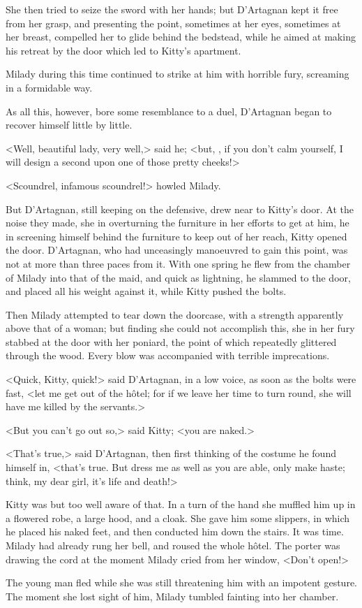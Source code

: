 She then tried to seize the sword with her hands; but D'Artagnan kept it free from her grasp, and presenting the point, sometimes at her eyes, sometimes at her breast, compelled her to glide behind the bedstead, while he aimed at making his retreat by the door which led to Kitty's apartment. 

Milady during this time continued to strike at him with horrible fury, screaming in a formidable way. 

As all this, however, bore some resemblance to a duel, D'Artagnan began to recover himself little by little. 

<Well, beautiful lady, very well,> said he; <but, , if you don't calm yourself, I will design a second  upon one of those pretty cheeks!> 

<Scoundrel, infamous scoundrel!> howled Milady. 

But D'Artagnan, still keeping on the defensive, drew near to Kitty's door. At the noise they made, she in overturning the furniture in her efforts to get at him, he in screening himself behind the furniture to keep out of her reach, Kitty opened the door. D'Artagnan, who had unceasingly manoeuvred to gain this point, was not at more than three paces from it. With one spring he flew from the chamber of Milady into that of the maid, and quick as lightning, he slammed to the door, and placed all his weight against it, while Kitty pushed the bolts. 

Then Milady attempted to tear down the doorcase, with a strength apparently above that of a woman; but finding she could not accomplish this, she in her fury stabbed at the door with her poniard, the point of which repeatedly glittered through the wood. Every blow was accompanied with terrible imprecations. 

<Quick, Kitty, quick!> said D'Artagnan, in a low voice, as soon as the bolts were fast, <let me get out of the hôtel; for if we leave her time to turn round, she will have me killed by the servants.> 

<But you can't go out so,> said Kitty; <you are naked.> 

<That's true,> said D'Artagnan, then first thinking of the costume he found himself in, <that's true. But dress me as well as you are able, only make haste; think, my dear girl, it's life and death!> 

Kitty was but too well aware of that. In a turn of the hand she muffled him up in a flowered robe, a large hood, and a cloak. She gave him some slippers, in which he placed his naked feet, and then conducted him down the stairs. It was time. Milady had already rung her bell, and roused the whole hôtel. The porter was drawing the cord at the moment Milady cried from her window, <Don't open!> 

The young man fled while she was still threatening him with an impotent gesture. The moment she lost sight of him, Milady tumbled fainting into her chamber. 